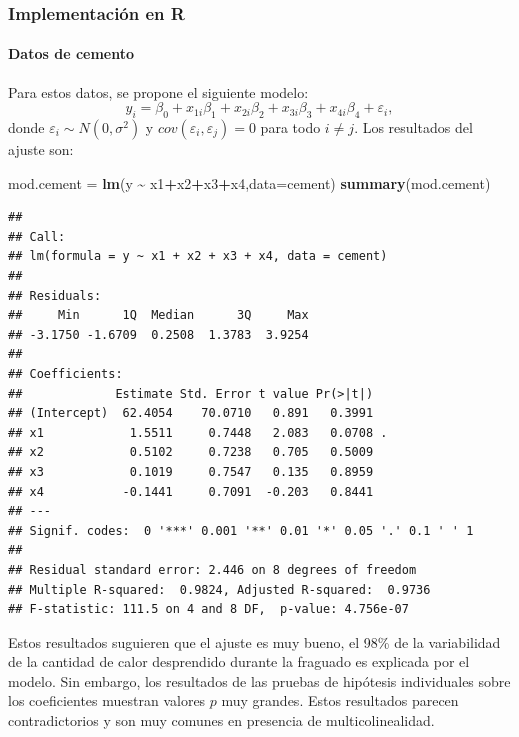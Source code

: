 \documentclass[
]{article}
\newenvironment{Shaded}{\begin{snugshade}}{\end{snugshade}}
\newcommand{\AttributeTok}[1]{\textcolor[rgb]{0.13,0.29,0.53}{#1}}
\newcommand{\FunctionTok}[1]{\textcolor[rgb]{0.13,0.29,0.53}{\textbf{#1}}}
\newcommand{\NormalTok}[1]{#1}
\newcommand{\OtherTok}[1]{\textcolor[rgb]{0.56,0.35,0.01}{#1}}
\newcommand{\SpecialCharTok}[1]{\textcolor[rgb]{0.81,0.36,0.00}{\textbf{#1}}}
\begin{document}
\subsubsection{Implementación en R}\label{implementaciuxf3n-en-r-4}

\paragraph*{Datos de cemento}\label{datos-de-cemento-1}

Para estos datos, se propone el siguiente modelo:
\[
y_{i} = \beta_{0} + x_{1i}\beta_{1} + x_{2i}\beta_{2} + x_{3i}\beta_{3} + x_{4i}\beta_{4} + \varepsilon_{i},
\]
donde \(\varepsilon_{i} \sim N(0, \sigma^2)\) y \(cov(\varepsilon_{i},\varepsilon_{j})=0\) para todo \(i \neq j\). Los resultados del ajuste son:

\begin{Shaded}
\begin{Highlighting}[]
\NormalTok{mod.cement }\OtherTok{=} \FunctionTok{lm}\NormalTok{(y }\SpecialCharTok{\textasciitilde{}}\NormalTok{ x1}\SpecialCharTok{+}\NormalTok{x2}\SpecialCharTok{+}\NormalTok{x3}\SpecialCharTok{+}\NormalTok{x4,}\AttributeTok{data=}\NormalTok{cement)}
\FunctionTok{summary}\NormalTok{(mod.cement)}
\end{Highlighting}
\end{Shaded}

\begin{verbatim}
## 
## Call:
## lm(formula = y ~ x1 + x2 + x3 + x4, data = cement)
## 
## Residuals:
##     Min      1Q  Median      3Q     Max 
## -3.1750 -1.6709  0.2508  1.3783  3.9254 
## 
## Coefficients:
##             Estimate Std. Error t value Pr(>|t|)  
## (Intercept)  62.4054    70.0710   0.891   0.3991  
## x1            1.5511     0.7448   2.083   0.0708 .
## x2            0.5102     0.7238   0.705   0.5009  
## x3            0.1019     0.7547   0.135   0.8959  
## x4           -0.1441     0.7091  -0.203   0.8441  
## ---
## Signif. codes:  0 '***' 0.001 '**' 0.01 '*' 0.05 '.' 0.1 ' ' 1
## 
## Residual standard error: 2.446 on 8 degrees of freedom
## Multiple R-squared:  0.9824, Adjusted R-squared:  0.9736 
## F-statistic: 111.5 on 4 and 8 DF,  p-value: 4.756e-07
\end{verbatim}

Estos resultados suguieren que el ajuste es muy bueno, el 98\% de la variabilidad de la cantidad de calor desprendido durante la fraguado es explicada por el modelo. Sin embargo, los resultados de las pruebas de hipótesis individuales sobre los coeficientes muestran valores \(p\) muy grandes. Estos resultados parecen contradictorios y son muy comunes en presencia de multicolinealidad.
\end{document}
